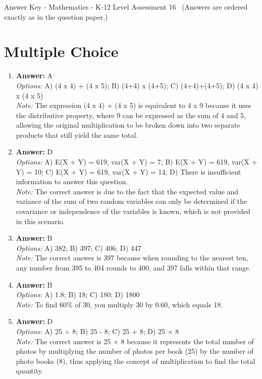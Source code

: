 \documentclass[12pt]{article}
\begin{document}
\begin{center}
Answer Key - Mathematics - K-12 Level Assessment 16 \
\small (Answers are ordered exactly as in the question paper.)
\end{center}

\section*{Multiple Choice}
\begin{enumerate}[label=\arabic*.]
\item \textbf{Answer:} A
\\ \textit{Options:} A) (4 x 4) + (4 x 5); B) (4+4) x (4+5); C) (4+4)+(4+5); D) (4 x 4) x (4 x 5)
\\ \textit{Note:} The expression (4 x 4) + (4 x 5) is equivalent to 4 x 9 because it uses the distributive property, where 9 can be expressed as the sum of 4 and 5, allowing the original multiplication to be broken down into two separate products that still yield the same total.
\item \textbf{Answer:} D
\\ \textit{Options:} A) E(X + Y) = 619, var(X + Y) = 7; B) E(X + Y) = 619, var(X + Y) = 10; C) E(X + Y) = 619, var(X + Y) = 14; D) There is insufficient information to answer this question.
\\ \textit{Note:} The correct answer is due to the fact that the expected value and variance of the sum of two random variables can only be determined if the covariance or independence of the variables is known, which is not provided in this scenario.
\item \textbf{Answer:} B
\\ \textit{Options:} A) 382; B) 397; C) 406; D) 447
\\ \textit{Note:} The correct answer is 397 because when rounding to the nearest ten, any number from 395 to 404 rounds to 400, and 397 falls within that range.
\item \textbf{Answer:} B
\\ \textit{Options:} A) 1.8; B) 18; C) 180; D) 1800
\\ \textit{Note:} To find 60\% of 30, you multiply 30 by 0.60, which equals 18.
\item \textbf{Answer:} D
\\ \textit{Options:} A) 25 \ensuremath{\div} 8; B) 25 - 8; C) 25 + 8; D) 25 \ensuremath{\times} 8
\\ \textit{Note:} The correct answer is 25 × 8 because it represents the total number of photos by multiplying the number of photos per book (25) by the number of photo books (8), thus applying the concept of multiplication to find the total quantity.
\end{enumerate}
\end{document}
